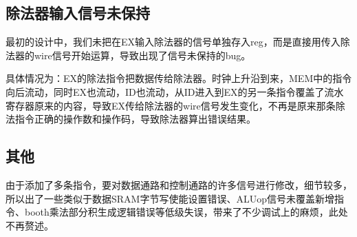 \documentclass[11pt]{article}
\begin{document}
\subsection{除法器输入信号未保持}
最初的设计中，我们未把在EX输入除法器的信号单独存入reg，而是直接用传入除法器的wire信号开始运算，导致出现了信号未保持的bug。

具体情况为：EX的除法指令把数据传给除法器。时钟上升沿到来，MEM中的指令向后流动，同时EX也流动，ID也流动，从ID进入到EX的另一条指令覆盖了流水寄存器原来的内容，导致EX传给除法器的wire信号发生变化，不再是原来那条除法指令正确的操作数和操作码，导致除法器算出错误结果。

\subsection{其他}
由于添加了多条指令，要对数据通路和控制通路的许多信号进行修改，细节较多，所以出了一些类似于数据SRAM字节写使能设置错误、ALUop信号未覆盖新增指令、booth乘法部分积生成逻辑错误等低级失误，带来了不少调试上的麻烦，此处不再赘述。





\end{document}
